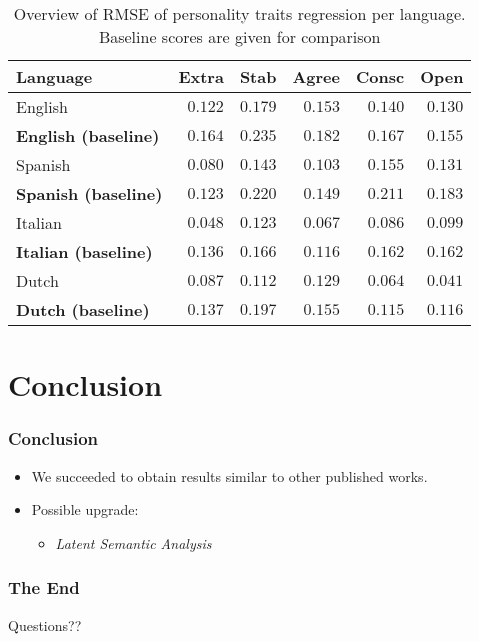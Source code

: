 \documentclass[utf8]{beamer}
\begin{document}
\begin{frame}
	\begin{table}
		\caption{Overview of RMSE of personality traits regression per language. Baseline scores are given for comparison}
		\label{tab:scores-personality}
		\begin{center}
			\begin{tabular}{l|rrrrr}
				\toprule
				Language & Extra & Stab & Agree & Consc & Open \\
				\midrule
				English & $ 0.122 $ & $ 0.179 $ & $ 0.153 $ & $ 0.140 $ & $ 0.130 $ \\
				\textbf{English (baseline)} & $ 0.164 $ & $ 0.235 $ & $ 0.182 $ & $ 0.167 $ & $ 0.155 $ \\
				Spanish & $ 0.080 $ & $ 0.143 $ & $ 0.103 $ & $ 0.155 $ & $ 0.131 $ \\
				\textbf{Spanish (baseline)} & $ 0.123 $ & $ 0.220 $ & $ 0.149 $ & $ 0.211 $ & $ 0.183 $ \\
				Italian & $ 0.048 $ & $ 0.123 $ & $ 0.067 $ & $ 0.086 $ & $ 0.099 $ \\
				\textbf{Italian (baseline)} & $ 0.136 $ & $ 0.166 $ & $ 0.116 $ & $ 0.162 $ & $ 0.162 $ \\
				Dutch & $ 0.087 $ & $ 0.112 $ & $ 0.129 $ & $ 0.064 $ & $ 0.041 $ \\
				\textbf{Dutch (baseline)} & $ 0.137 $ & $ 0.197 $ & $ 0.155 $ & $ 0.115 $ & $ 0.116 $ \\
				\bottomrule
			\end{tabular}
		\end{center}
	\end{table}
\end{frame}
\section{Conclusion}


\begin{frame}
	\frametitle{Conclusion}
	\begin{itemize}
		\item We succeeded to obtain results similar to other published works.\\
		\vspace{20px}
		\item Possible upgrade:
		\begin{itemize}
			\item \textit{Latent Semantic Analysis}
		\end{itemize}
	\end{itemize}
\end{frame}


\begin{frame}
		\frametitle{The End}
	\Huge{\centerline{Questions??}}
\end{frame}

\end{document}
